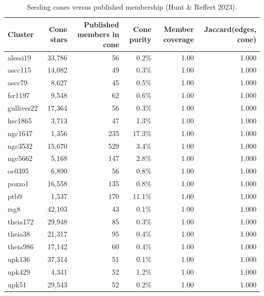 \begin{table}[htbp]\centering\small
\caption{Seeding cones versus published membership (Hunt \& Reffert 2023).}\label{tab:membership_diag}
\begin{tabular}{lrrrrr}
\toprule
Cluster & Cone stars & Published members in cone & Cone purity & Member coverage & Jaccard(edges, cone) \\
\midrule
alessi19 & 33,786 & 56 & 0.2\% & 1.00 & 1.000 \\
ascc115 & 14,082 & 49 & 0.3\% & 1.00 & 1.000 \\
ascc79 & 8,627 & 45 & 0.5\% & 1.00 & 1.000 \\
fsr1197 & 9,548 & 62 & 0.6\% & 1.00 & 1.000 \\
gulliver22 & 17,364 & 56 & 0.3\% & 1.00 & 1.000 \\
hsc1865 & 3,713 & 47 & 1.3\% & 1.00 & 1.000 \\
ngc1647 & 1,356 & 235 & 17.3\% & 1.00 & 1.000 \\
ngc3532 & 15,670 & 529 & 3.4\% & 1.00 & 1.000 \\
ngc5662 & 5,168 & 147 & 2.8\% & 1.00 & 1.000 \\
oc0395 & 6,890 & 56 & 0.8\% & 1.00 & 1.000 \\
pozzo1 & 16,558 & 135 & 0.8\% & 1.00 & 1.000 \\
ptb9 & 1,537 & 170 & 11.1\% & 1.00 & 1.000 \\
rsg8 & 42,103 & 43 & 0.1\% & 1.00 & 1.000 \\
theia172 & 29,948 & 85 & 0.3\% & 1.00 & 1.000 \\
theia38 & 21,317 & 95 & 0.4\% & 1.00 & 1.000 \\
theia986 & 17,142 & 60 & 0.4\% & 1.00 & 1.000 \\
upk136 & 37,314 & 51 & 0.1\% & 1.00 & 1.000 \\
upk429 & 4,341 & 52 & 1.2\% & 1.00 & 1.000 \\
upk51 & 29,543 & 52 & 0.2\% & 1.00 & 1.000 \\
\bottomrule
\end{tabular}
\end{table}
